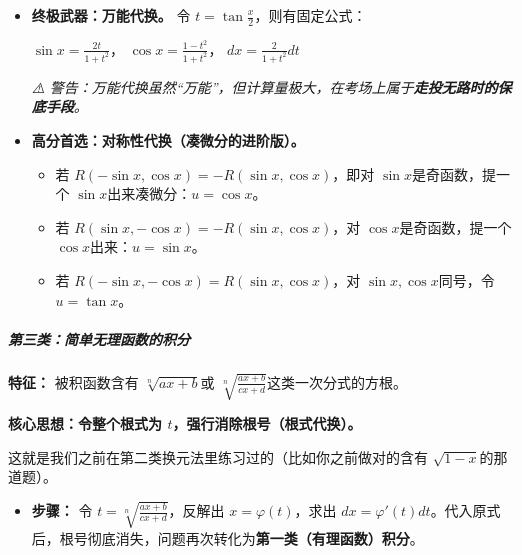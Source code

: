 \documentclass[
]{article}
\begin{document}
\begin{itemize}
\item
  \textbf{终极武器：万能代换。} 令
  \(t = \tan \frac{x}{2}\)，则有固定公式：

  \(\sin x = \frac{2t}{1+t^2}\)， \(\cos x = \frac{1-t^2}{1+t^2}\)，
  \(dx = \frac{2}{1+t^2} dt\)

  \emph{⚠️
  警告：万能代换虽然``万能''，但计算量极大，在考场上属于\textbf{走投无路时的保底手段}。}
\item
  \textbf{高分首选：对称性代换（凑微分的进阶版）。}

  \begin{itemize}
  \item
    若 \(R(-\sin x, \cos x) = -R(\sin x, \cos x)\)，即对
    \(\sin x\)是奇函数，提一个 \(\sin x\)出来凑微分：\(u = \cos x\)。
  \item
    若 \(R(\sin x, -\cos x) = -R(\sin x, \cos x)\)，对
    \(\cos x\)是奇函数，提一个 \(\cos x\)出来：\(u = \sin x\)。
  \item
    若 \(R(-\sin x, -\cos x) = R(\sin x, \cos x)\)，对
    \(\sin x, \cos x\)同号，令 \(u = \tan x\)。
  \end{itemize}
\end{itemize}

\subparagraph{第三类：简单无理函数的积分}\label{ux7b2cux4e09ux7c7bux7b80ux5355ux65e0ux7406ux51fdux6570ux7684ux79efux5206}

\textbf{特征：} 被积函数含有 \(\sqrt[n]{ax+b}\)或
\(\sqrt[n]{\frac{ax+b}{cx+d}}\)这类一次分式的方根。

\textbf{核心思想：令整个根式为 \(t\)，强行消除根号（根式代换）。}

这就是我们之前在第二类换元法里练习过的（比如你之前做对的含有
\(\sqrt{1-x}\)的那道题）。

\begin{itemize}
\item
  \textbf{步骤：} 令 \(t = \sqrt[n]{\frac{ax+b}{cx+d}}\)，反解出
  \(x = \varphi(t)\)，求出
  \(dx = \varphi'(t)dt\)。代入原式后，根号彻底消失，问题再次转化为\textbf{第一类（有理函数）积分}。
\end{itemize}
\end{document}

